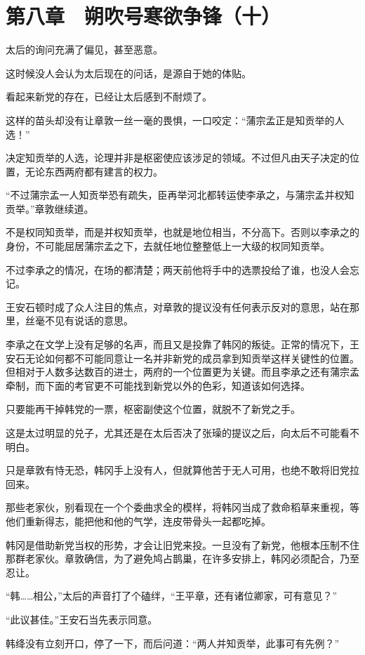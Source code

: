 \section{第八章　朔吹号寒欲争锋（十）}

太后的询问充满了偏见，甚至恶意。

这时候没人会认为太后现在的问话，是源自于她的体贴。

看起来新党的存在，已经让太后感到不耐烦了。

这样的苗头却没有让章敦一丝一毫的畏惧，一口咬定：“蒲宗孟正是知贡举的人选！”

决定知贡举的人选，论理并非是枢密使应该涉足的领域。不过但凡由天子决定的位置，无论东西两府都有建言的权力。

“不过蒲宗孟一人知贡举恐有疏失，臣再举河北都转运使李承之，与蒲宗孟并权知贡举。”章敦继续道。

不是权同知贡举，而是并权知贡举，也就是地位相当，不分高下。否则以李承之的身份，不可能屈居蒲宗孟之下，去就任地位整整低上一大级的权同知贡举。

不过李承之的情况，在场的都清楚；两天前他将手中的选票投给了谁，也没人会忘记。

王安石顿时成了众人注目的焦点，对章敦的提议没有任何表示反对的意思，站在那里，丝毫不见有说话的意思。

李承之在文学上没有足够的名声，而且又是投靠了韩冈的叛徒。正常的情况下，王安石无论如何都不可能同意让一名并非新党的成员拿到知贡举这样关键性的位置。但相对于人数多达数百的进士，两府的一个位置更为关键。而且李承之还有蒲宗孟牵制，而下面的考官更不可能找到新党以外的色彩，知道该如何选择。

只要能再干掉韩党的一票，枢密副使这个位置，就脱不了新党之手。

这是太过明显的兑子，尤其还是在太后否决了张璪的提议之后，向太后不可能看不明白。

只是章敦有恃无恐，韩冈手上没有人，但就算他苦于无人可用，也绝不敢将旧党拉回来。

那些老家伙，别看现在一个个委曲求全的模样，将韩冈当成了救命稻草来重视，等他们重新得志，能把他和他的气学，连皮带骨头一起都吃掉。

韩冈是借助新党当权的形势，才会让旧党来投。一旦没有了新党，他根本压制不住那群老家伙。章敦确信，为了避免鸠占鹊巢，在许多安排上，韩冈必须配合，乃至忍让。

“韩……相公，”太后的声音打了个磕绊，“王平章，还有诸位卿家，可有意见？”

“此议甚佳。”王安石当先表示同意。

韩绛没有立刻开口，停了一下，而后问道：“两人并知贡举，此事可有先例？”

